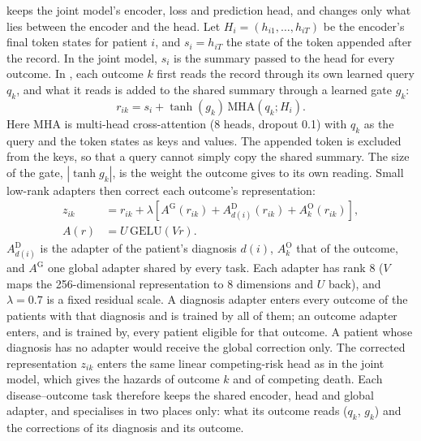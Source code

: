 \label{sec:opera-formulation}
\opera{} keeps the joint model's encoder, loss and prediction head, and changes
only what lies between the encoder and the head. Let $H_i=(h_{i1},\dots,h_{iT})$
be the encoder's final token states for patient $i$, and $s_i=h_{iT}$ the state
of the token appended after the record. In the joint model, $s_i$ is the
summary passed to the head for every outcome. In \opera{}, each outcome $k$
first reads the record through its own learned query $q_k$, and what it reads
is added to the shared summary through a learned gate $g_k$:
\begin{equation}
 r_{ik}=s_i+\tanh(g_k)\,\mathrm{MHA}\!\left(q_k;H_i\right).
 \label{eq:opera-reading}
\end{equation}
Here MHA is multi-head cross-attention (8 heads, dropout 0.1) with $q_k$ as the
query and the token states as keys and values. The appended token is excluded
from the keys, so that a query cannot simply copy the shared summary. The size
of the gate, $|\tanh g_k|$, is the weight the outcome gives to its own reading.
Small low-rank adapters \citep{houlsby2019adapters,hu2022lora} then correct
each outcome's representation:
\begin{equation}
 \begin{aligned}
 z_{ik}&=r_{ik}+\lambda\left[A^{\mathrm{G}}(r_{ik})+A^{\mathrm{D}}_{d(i)}(r_{ik})+A^{\mathrm{O}}_{k}(r_{ik})\right],\\
 A(r)&=U\,\mathrm{GELU}(V r).
 \end{aligned}
 \label{eq:opera-corrections}
\end{equation}
$A^{\mathrm{D}}_{d(i)}$ is the adapter of the patient's diagnosis $d(i)$,
$A^{\mathrm{O}}_{k}$ that of the outcome, and $A^{\mathrm{G}}$ one global adapter
shared by every task. Each adapter has rank 8 ($V$ maps the 256-dimensional
representation to 8 dimensions and $U$ back), and $\lambda=0.7$ is a fixed
residual scale. A diagnosis adapter enters every outcome of the patients with
that diagnosis and is trained by all of them; an outcome adapter enters, and is
trained by, every patient eligible for that outcome. A patient whose diagnosis
has no adapter would receive the global correction only. The corrected
representation $z_{ik}$ enters the same linear competing-risk head as in the
joint model, which gives the hazards of outcome $k$ and of competing death.
Each disease--outcome task therefore keeps the shared encoder, head and global
adapter, and specialises in two places only: what its outcome reads ($q_k$,
$g_k$) and the corrections of its diagnosis and its outcome.

